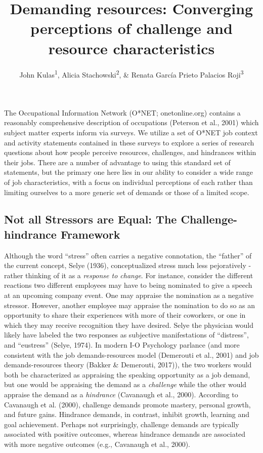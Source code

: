 \documentclass[
  man]{apa6}
\title{Demanding resources: Converging perceptions of challenge and resource characteristics}
\author{John Kulas\textsuperscript{1}, Alicia Stachowski\textsuperscript{2}, \& Renata García Prieto Palacios Roji\textsuperscript{3}}
\date{}
\affiliation{\vspace{0.5cm}\textsuperscript{1} eRg\\\textsuperscript{2} University of Wisconsin - Stout\\\textsuperscript{3} PepsiCo}
\begin{document}
\maketitle

The Occupational Information Network (O*NET; onetonline.org) contains a reasonably comprehensive description of occupations (Peterson et al., 2001) which subject matter experts inform via surveys. We utilize a set of O*NET job context and activity statements contained in these surveys to explore a series of research questions about how people perceive resources, challenges, and hindrances within their jobs. There are a number of advantage to using this standard set of statements, but the primary one here lies in our ability to consider a wide range of job characteristics, with a focus on individual perceptions of each rather than limiting ourselves to a more generic set of demands or those of a limited scope.

\hypertarget{not-all-stressors-are-equal-the-challenge-hindrance-framework}{%
\subsection{Not all Stressors are Equal: The Challenge-hindrance Framework}\label{not-all-stressors-are-equal-the-challenge-hindrance-framework}}

Although the word ``stress'' often carries a negative connotation, the ``father'' of the current concept, Selye (1936), conceptualized stress much less pejoratively - rather thinking of it as a \emph{response to change}. For instance, consider the different reactions two different employees may have to being nominated to give a speech at an upcoming company event. One may appraise the nomination as a negative stressor. However, another employee may appraise the nomination to do so as an opportunity to share their experiences with more of their coworkers, or one in which they may receive recognition they have desired. Selye the physician would likely have labeled the two responses as subjective manifestations of ``distress'', and ``eustress'' (Selye, 1974). In modern I-O Psychology parlance (and more consistent with the job demands-resources model (Demerouti et al., 2001) and job demands-resources theory (Bakker \& Demerouti, 2017)), the two workers would both be characterized as appraising the speaking opportunity as a job demand, but one would be appraising the demand as a \emph{challenge} while the other would appraise the demand as a \emph{hindrance} (Cavanaugh et al., 2000). According to Cavanaugh et al. (2000), challenge demands promote mastery, personal growth, and future gains. Hindrance demands, in contrast, inhibit growth, learning and goal achievement. Perhaps not surprisingly, challenge demands are typically associated with positive outcomes, whereas hindrance demands are associated with more negative outcomes (e.g., Cavanaugh et al., 2000).
\end{document}
